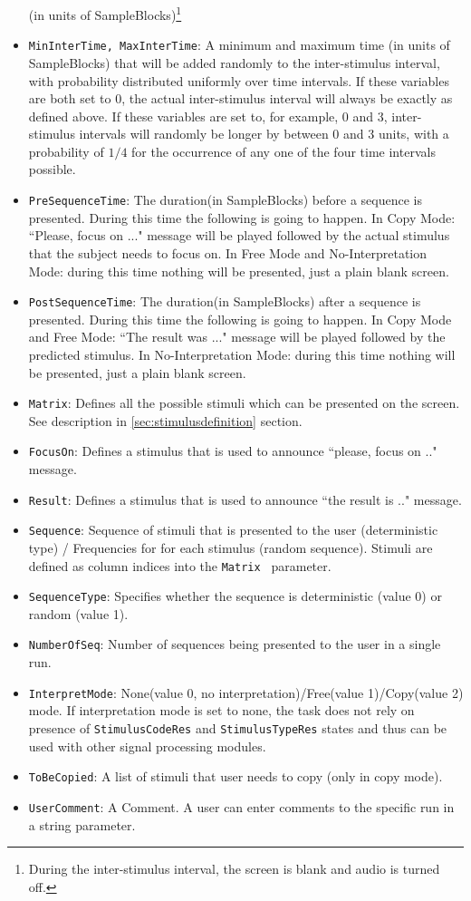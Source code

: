 \documentclass[letterpaper,oneside,12pt]{article}
\begin{document}
\begin{itemize}
       (in units of SampleBlocks)\footnote{During the inter-stimulus interval, the
       screen is blank and audio is turned off.}
 \item {\tt MinInterTime, MaxInterTime}: A minimum and maximum time (in units of SampleBlocks) that will be added randomly
       to the inter-stimulus interval, with probability distributed uniformly over time
       intervals.
       If these variables are both set to 0, the actual inter-stimulus interval will
       always be exactly as defined above.
       If these variables are set to, for example, 0 and 3, inter-stimulus intervals
       will randomly be longer by between 0 and 3 units, with a probability of $1/4$
       for the occurrence of any one of the four time intervals possible.
 \item {\tt PreSequenceTime}: The duration(in SampleBlocks) before a sequence is presented. During this time the following is going to happen. In Copy Mode: ``Please, focus on ..." message will be played followed by the actual stimulus that the subject needs to focus on.
 In Free Mode and No-Interpretation Mode: during this time nothing will be presented, just a plain blank screen.
 \item {\tt PostSequenceTime}: The duration(in SampleBlocks) after a sequence is presented. During this time the following is going to happen. In Copy Mode and Free Mode: ``The result was ..." message will be played followed by the predicted stimulus.
 In No-Interpretation Mode: during this time nothing will be presented, just a plain blank screen.
 \item {\tt Matrix}: Defines all the possible stimuli which can be presented on the screen. See description in \ref{sec:stimulusdefinition} section.
 \item {\tt FocusOn}: Defines a stimulus that is used to announce ``please, focus on .." message.
 \item {\tt Result}: Defines a stimulus that is used to announce ``the result is .." message.
 \item {\tt Sequence}: Sequence of stimuli that is presented to the user (deterministic type) / Frequencies for for each stimulus (random sequence).
 Stimuli are defined as column indices into the  {\tt Matrix } parameter.
 \item {\tt SequenceType}: Specifies whether the sequence is deterministic (value 0) or random (value 1).
 \item {\tt NumberOfSeq}: Number of sequences being presented to the user in a single run.
 \item {\tt InterpretMode}: None(value 0, no interpretation)/Free(value 1)/Copy(value 2) mode. If interpretation mode is set to none, the task does not rely on presence of 
 {\tt StimulusCodeRes} and {\tt StimulusTypeRes} states and thus can be used with other signal processing modules.
 \item {\tt ToBeCopied}: A list of stimuli that user needs to copy (only in copy mode). 
 \item {\tt UserComment}: A Comment. A user can enter comments to the specific run in a string parameter.
\end{itemize}
\end{document}
